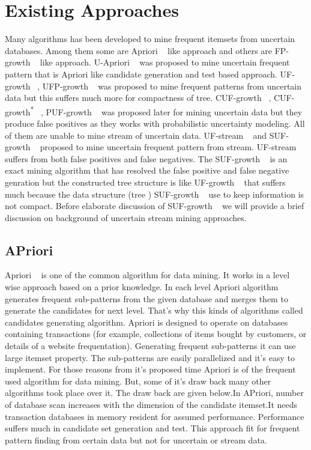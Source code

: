 \section{Existing Approaches}
Many algorithms has been developed to mine frequent itemsets from uncertain databases. Among them some are Apriori ~\cite{apriori} like approach and others are FP-growth ~\cite{fp_growth} like approach. U-Apriori ~\cite{u_priori} was proposed to mine uncertain frequent pattern that is Apriori like candidate generation and test based approach. UF-growth ~\cite{uf_growth}, UFP-growth ~\cite{ufp_growth} was proposed to mine frequent patterns from uncertain data but this suffers much more for compactness of tree. CUF-growth ~\cite{cuf_growth}, CUF-growth\textsuperscript{*} ~\cite{cuf_growth}, PUF-growth ~\cite{cuf_growth} was proposed later for mining uncertain data but they produce false positives as they works with probabilistic uncertainty modeling. All of them are unable to mine stream of uncertain data. UF-stream ~\cite{suf_growth} and SUF-growth ~\cite{suf_growth} proposed to mine uncertain frequent pattern from stream. UF-stream ~\cite{suf_growth} suffers from both false positives and false negatives. The SUF-growth ~\cite{suf_growth} is an exact mining algorithm that has resolved the false positive and false negative genration but the constructed tree structure is like UF-growth ~\cite{uf_growth} that suffers much because the data structure (tree ) SUF-growth ~\cite{suf_growth} use to keep information is not compact. Before elaborate discussion of SUF-growth ~\cite{suf_growth} we will provide a brief discussion on background of uncertain stream mining approaches.

	
	\subsection{APriori}
	Apriori ~\cite{apriori} is one of the common algorithm for data mining. It works in a level wise approach based on a prior knowledge. In each level Apriori algorithm generates frequent sub-patterns from the given database and merges them to generate the candidates for next level. That's why this kinds of algorithms called candidates generating algorithm.  Apriori is designed to operate on databases containing transactions (for example, collections of items bought by customers, or details of a website frequentation). Generating frequent sub-patterns it can use large itemset property. The sub-patterns are easily parallelized and it's easy to implement. For those reasons from it's proposed time Apriori is of the frequent used algorithm for data mining.	But, some of it's draw back many other algorithms took place over it. The draw back are given below.In APriori, number of database scan increases with the dimension of the candidate itemset.It needs transaction databases in memory resident for assumed performance. Performance suffers much in candidate set generation and test. This approach fit for frequent pattern finding from certain data but not for uncertain or stream data.
	
